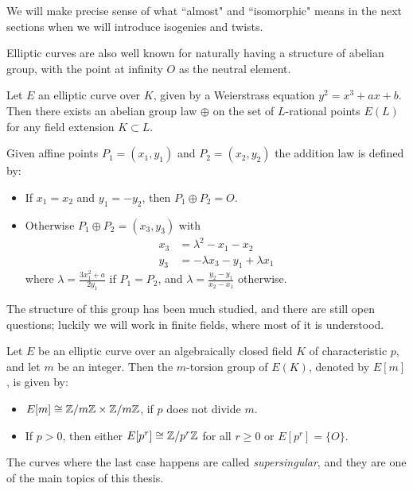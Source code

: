 We will make precise sense of what ``almost" and ``isomorphic" means in the next sections when we will introduce isogenies and twists.

Elliptic curves are also well known for naturally having a structure of abelian group, with the point at infinity $O$ as the neutral element.

\begin{theorem}
    Let $E$ an elliptic curve over $K$, given by a Weierstrass equation $y^2=x^3+ax+b$. Then there exists an abelian group law $\oplus$ on the set of $L$-rational points $E(L)$ for any field extension $K\subset L$.
    
    Given affine points $P_1=(x_1,y_1)$ and $P_2=(x_2,y_2)$ the addition law is defined by:
    \begin{itemize}
        \item If $x_1=x_2$ and $y_1=-y_2$, then $P_1\oplus P_2=O$.
        \item Otherwise $P_1\oplus P_2=(x_3,y_3)$ with \begin{align*}
            x_3 &=  \lambda^2-x_1-x_2\\
            y_3 &= -\lambda x_3-y_1+\lambda x_1
        \end{align*}
        where $\lambda=\frac{3x_1^2+a}{2y_1}$ if $P_1=P_2$, and $\lambda=\frac{y_2-y_1}{x_2-x_1}$ otherwise.
    \end{itemize}
\end{theorem}

The structure of this group has been much studied, and there are still open questions; luckily we will work in finite fields, where most of it is understood.

\begin{theorem}
    Let $E$ be an elliptic curve over an algebraically closed field $K$ of characteristic $p$, and let $m$ be an integer. Then the $m$-torsion group of $E(K)$, denoted by $E[m]$, is given by:
    \begin{itemize}
        \item $E[m]\cong \mathbb{Z}/m\mathbb{Z}\times\mathbb{Z}/m\mathbb{Z}$, if $p$ does not divide $m$.
        \item If $p>0$, then either $E[p^r]\cong\mathbb{Z}/p^r\mathbb{Z}$ for all $r\ge0$ or $E[p^r]=\{O\}$.
    \end{itemize}
\end{theorem}

The curves where the last case happens are called \emph{supersingular}, and they are one of the main topics of this thesis.


